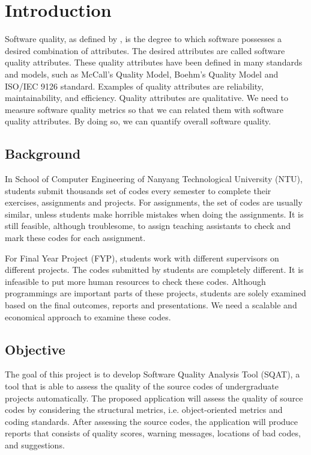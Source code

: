 \chapter{Introduction}

Software quality, as defined by \citet{ieee_quality}, is the degree to which software possesses a desired combination of attributes. The desired attributes are called software quality attributes. These quality attributes have been defined in many standards and models, such as McCall's Quality Model, Boehm's Quality Model and ISO/IEC 9126 standard. Examples of quality attributes are reliability, maintainability, and efficiency. Quality attributes are qualitative. We need to measure software quality metrics so that we can related them with software quality attributes. By doing so, we can quantify overall software quality. 

\section{Background}

In School of Computer Engineering of Nanyang Technological University (NTU), students submit thousands set of codes every semester to complete their exercises, assignments and projects. For assignments, the set of codes are usually similar, unless students make horrible mistakes when doing the assignments. It is still feasible, although troublesome, to assign teaching assistants to check and mark these codes for each assignment. 

For Final Year Project (FYP), students work with different supervisors on different projects. The codes submitted by students are completely different. It is infeasible to put more human resources to check these codes. Although programmings are important parts of these projects, students are solely examined based on the final outcomes, reports and presentations. We need a scalable and economical approach to examine these codes. 

\section{Objective}

The goal of this project is to develop Software Quality Analysis Tool (SQAT), a tool that is able to assess the quality of the source codes of undergraduate projects automatically. The proposed application will assess the quality of source codes by considering the structural metrics, i.e. object-oriented metrics and coding standards. After assessing the source codes, the application will produce reports that consists of quality scores, warning messages, locations of bad codes, and suggestions.


